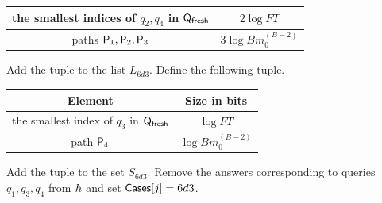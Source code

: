 \begin{enumerate}
\begin{enumerate}
\begin{itemize}
\begin{itemize}
\begin{enumerate}
\begin{center}
\begin{tabular}{|c|c|}
    the smallest indices of $q_2,q_4$ in $\mathsf{Q}_\textsf{fresh}$ & $2\log FT$   \\\hline
            
    paths $\mathsf{P}_1,\mathsf{P}_2,\mathsf{P}_3$ & $ 3\log Bm_0^{(B-2)}$\\\hline
    
    \end{tabular}
    \end{center}
   Add the tuple to the list $L_{6d3}$. Define the following tuple.
   \begin{center}
    \begin{tabular}{|c|c|}\hline

    Element & Size in bits \\ \hline\hline

    the smallest index  of $q_3$ in $\mathsf{Q}_\textsf{fresh}$ & $\log FT$   \\\hline
            
    path $\mathsf{P}_4$ & $ \log Bm_0^{(B-2)}$\\\hline
    
    \end{tabular}
    \end{center}
   Add the tuple to the set $S_{6d3}$.
   Remove the answers corresponding to queries $q_1,q_3,q_4$ from $\tilde{h}$ and set $\mathsf{Cases}[j]=6d3$.


\end{enumerate}
\end{itemize}
\end{itemize}
\end{enumerate}
\end{enumerate}
